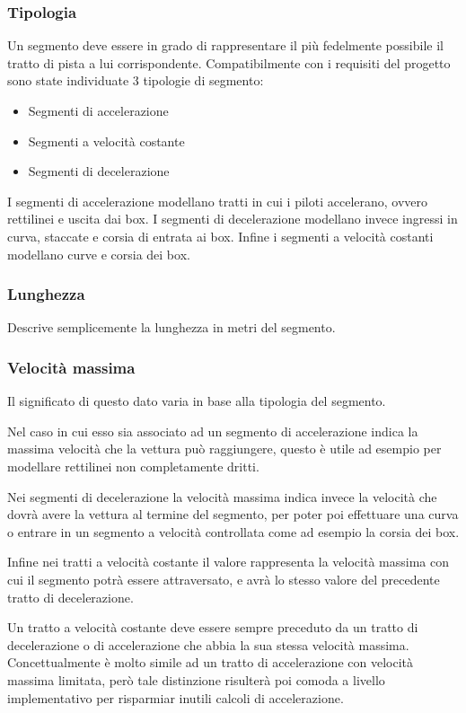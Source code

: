 \documentclass[a4paper,11pt, twoside]{book}
\begin{document}
	\subsubsection{Tipologia}
	  Un segmento deve essere in grado di rappresentare il più fedelmente possibile il tratto di pista
	  a lui corrispondente. Compatibilmente con i requisiti del progetto sono state individuate 3
	  tipologie di segmento:
	  
	  \begin{itemize}
	    \item Segmenti di accelerazione
	    \item Segmenti a velocità costante
	    \item Segmenti di decelerazione
	  \end{itemize}
	  
	  I segmenti di accelerazione modellano tratti in cui i piloti accelerano, ovvero rettilinei e uscita dai box. I segmenti di
	  decelerazione modellano invece ingressi in curva, staccate e corsia di entrata ai box. Infine
	  i segmenti a velocità costanti modellano curve e corsia dei box.
	  
	\subsubsection{Lunghezza}
	  Descrive semplicemente la lunghezza in metri del segmento.
	
	\subsubsection{Velocità massima}
	  Il significato di questo dato varia in base alla tipologia del segmento. 
	  
	  Nel caso
	  in cui esso sia associato ad un segmento di accelerazione indica la massima velocità che la vettura può raggiungere,
	  questo è utile ad esempio per modellare rettilinei non completamente dritti.
	  
	  Nei segmenti di decelerazione la velocità massima indica invece la velocità che dovrà avere la vettura al termine del
	  segmento, per poter poi effettuare una curva o entrare in un segmento a velocità controllata come ad esempio la
	  corsia dei box.
	  
	  Infine nei tratti a velocità costante il valore rappresenta la velocità massima con cui il segmento potrà essere
	  attraversato, e avrà lo stesso valore del precedente tratto di decelerazione.
	  
	  Un tratto a velocità costante deve essere sempre preceduto da un tratto di decelerazione o di accelerazione
	  che abbia la sua stessa velocità massima. Concettualmente è molto simile ad un tratto di accelerazione
	  con velocità massima limitata, però tale distinzione risulterà poi comoda a livello implementativo
	  per risparmiar inutili calcoli di accelerazione.
	  
\end{document}
